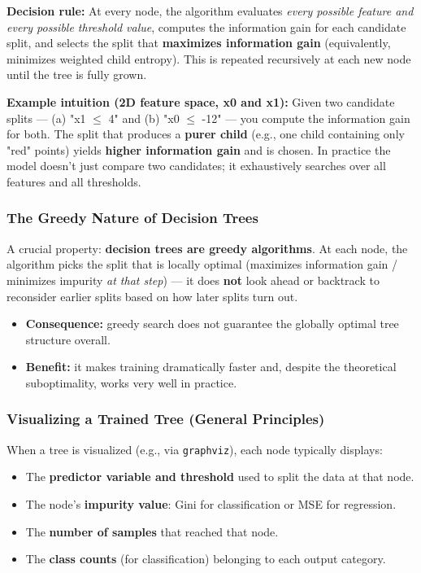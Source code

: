 \documentclass[12pt,openany]{book}
\begin{document}
\textbf{Decision rule:} At every node, the algorithm evaluates \textit{every possible feature and every possible threshold value}, computes the information gain for each candidate split, and selects the split that \textbf{maximizes information gain} (equivalently, minimizes weighted child entropy). This is repeated recursively at each new node until the tree is fully grown.

\textbf{Example intuition (2D feature space, x0 and x1):}
Given two candidate splits --- (a) "x1 \(\leq\) 4" and (b) "x0 \(\leq\) -12" --- you compute the information gain for both. The split that produces a \textbf{purer child} (e.g., one child containing only "red" points) yields \textbf{higher information gain} and is chosen. In practice the model doesn't just compare two candidates; it exhaustively searches over all features and all thresholds.

\subsubsection{The Greedy Nature of Decision Trees}


A crucial property: \textbf{decision trees are greedy algorithms}. At each node, the algorithm picks the split that is locally optimal (maximizes information gain / minimizes impurity \textit{at that step}) --- it does \textbf{not} look ahead or backtrack to reconsider earlier splits based on how later splits turn out.

\begin{itemize}[leftmargin=*]
    \item \textbf{Consequence:} greedy search does not guarantee the globally optimal tree structure overall.
    \item \textbf{Benefit:} it makes training dramatically faster and, despite the theoretical suboptimality, works very well in practice.
\end{itemize}


\subsubsection{Visualizing a Trained Tree (General Principles)}


When a tree is visualized (e.g., via \texttt{graphviz}), each node typically displays:

\begin{itemize}[leftmargin=*]
    \item The \textbf{predictor variable and threshold} used to split the data at that node.
    \item The node's \textbf{impurity value}: Gini for classification or MSE for regression.
    \item The \textbf{number of samples} that reached that node.
    \item The \textbf{class counts} (for classification) belonging to each output category.

\end{itemize}
\end{document}
